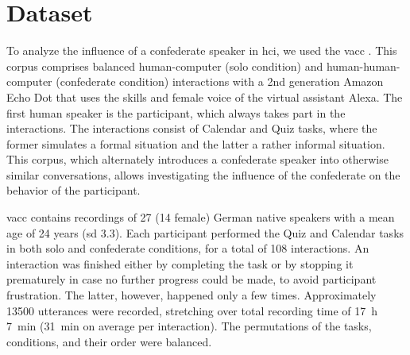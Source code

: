 
\section{Dataset}
\label{sec:dataset}

To analyze the influence of a confederate speaker in \ac{hci}, we used the \acf{vacc} \citep{Siegert2018VACC}.
This corpus comprises balanced human-computer (solo condition) and human-human-computer (confederate condition) interactions with a 2nd generation Amazon Echo Dot that uses the skills and female voice of the virtual assistant Alexa.
The first human speaker is the participant, which always takes part in the interactions.
The interactions consist of Calendar and Quiz tasks, where the former simulates a formal situation and the latter a rather informal situation.
This corpus, which alternately introduces a confederate speaker into otherwise similar conversations, allows investigating the influence of the confederate on the behavior of the participant.

\ac{vacc} contains recordings of 27 (14 female) German native speakers with a mean age of 24 years (sd 3.3).
Each participant performed the Quiz and Calendar tasks in both solo and confederate conditions, for a total of 108 interactions.
An interaction was finished either by completing the task or by stopping it prematurely in case no further progress could be made, to avoid participant frustration.
The latter, however, happened only a few times.
Approximately \num{13500} utterances were recorded, stretching over total recording time of \SI{17}{\hour} \SI{7}{\minute} (\SI{31}{\minute} on average per interaction).
The permutations of the tasks, conditions, and their order were balanced.

